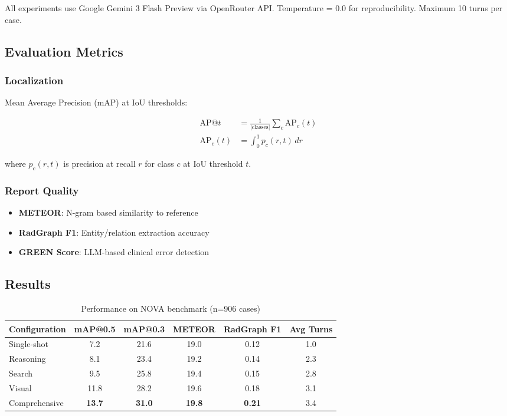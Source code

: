 \documentclass[11pt]{article}
\begin{document}
All experiments use Google Gemini 3 Flash Preview via OpenRouter API. Temperature = 0.0 for reproducibility. Maximum 10 turns per case.

\subsection{Evaluation Metrics}

\subsubsection{Localization}

Mean Average Precision (mAP) at IoU thresholds:

\begin{align}
    \text{AP@}t &= \frac{1}{|\text{classes}|} \sum_{c} \text{AP}_c(t) \\
    \text{AP}_c(t) &= \int_0^1 p_c(r, t) \, dr
\end{align}

where $p_c(r, t)$ is precision at recall $r$ for class $c$ at IoU threshold $t$.

\subsubsection{Report Quality}

\begin{itemize}
    \item \textbf{METEOR}: N-gram based similarity to reference
    \item \textbf{RadGraph F1}: Entity/relation extraction accuracy \citep{radgraph2022}
    \item \textbf{GREEN Score}: LLM-based clinical error detection \citep{ostmeier2024green}
\end{itemize}

\subsection{Results}

\begin{table}[h]
\centering
\caption{Performance on NOVA benchmark (n=906 cases)}
\label{tab:results}
\begin{tabular}{@{}lccccc@{}}
\toprule
Configuration & mAP@0.5 & mAP@0.3 & METEOR & RadGraph F1 & Avg Turns \\
\midrule
Single-shot & 7.2 & 21.6 & 19.0 & 0.12 & 1.0 \\
Reasoning & 8.1 & 23.4 & 19.2 & 0.14 & 2.3 \\
Search & 9.5 & 25.8 & 19.4 & 0.15 & 2.8 \\
Visual & 11.8 & 28.2 & 19.6 & 0.18 & 3.1 \\
Comprehensive & \textbf{13.7} & \textbf{31.0} & \textbf{19.8} & \textbf{0.21} & 3.4 \\
\bottomrule
\end{tabular}
\end{table}
\end{document}
